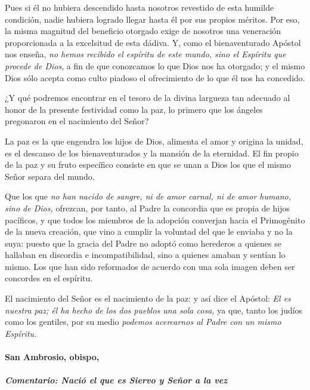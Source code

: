 \documentclass[]{article}
\let\oldparagraph\paragraph
\renewcommand{\paragraph}[1]{\oldparagraph{#1}\mbox{}}
\let\oldsubparagraph\subparagraph
\renewcommand{\subparagraph}[1]{\oldsubparagraph{#1}\mbox{}}
\begin{document}
Pues si él no hubiera descendido hasta nosotros revestido de esta
humilde condición, nadie hubiera logrado llegar hasta él por sus propios
méritos. Por eso, la misma magnitud del beneficio otorgado exige de
nosotros una veneración proporcionada a la excelsitud de esta dádiva. Y,
como el bienaventurado Apóstol nos enseña, \emph{no hemos recibido el
espíritu de este mundo, sino el Espíritu que procede de Dios}, a fin de
que conozcamos lo que Dios nos ha otorgado; y el mismo Dios sólo acepta
como culto piadoso el ofrecimiento de lo que él nos ha concedido.

¿Y qué podremos encontrar en el tesoro de la divina largueza tan
adecuado al honor de la presente festividad como la paz, lo primero que
los ángeles pregonaron en el nacimiento del Señor?

La paz es la que engendra los hijos de Dios, alimenta el amor y origina
la unidad, es el descanso de los bienaventurados y la mansión de la
eternidad. El fin propio de la paz y su fruto específico consiste en que
se unan a Dios los que el mismo Señor separa del mundo.

Que los que \emph{no han nacido de sangre, ni de amor carnal, ni de amor
humano, sino de Dios,} ofrezcan, por tanto, al Padre la concordia que es
propia de hijos pacíficos, y que todos los miembros de la adopción
converjan hacia el Primogénito de la nueva creación, que vino a cumplir
la voluntad del que le enviaba y no la suya: puesto que la gracia del
Padre no adoptó como herederos a quienes se hallaban en discordia e
incompatibilidad, sino a quienes amaban y sentían lo mismo. Los que han
sido reformados de acuerdo con una sola imagen deben ser concordes en el
espíritu.

El nacimiento del Señor es el nacimiento de la paz: y así dice el
Apóstol: \emph{El es nuestra paz; él ha hecho de los dos pueblos una
sola cosa,} ya que, tanto los judíos como los gentiles, por su medio
\emph{podemos acercarnos al Padre con un mismo
Espíritu.}\protect\hypertarget{_Toc448662804}{}{\protect\hypertarget{_Toc448690323}{}{\protect\hypertarget{_Toc448708346}{}{\protect\hypertarget{_Toc448709432}{}{\protect\hypertarget{_Toc449554434}{}{}}}}}

\paragraph{San Ambrosio, obispo,}\label{san-ambrosio-obispo-1}

\subparagraph{Comentario: Nació el que es Siervo y Señor a la
vez}\label{comentario-naciuxf3-el-que-es-siervo-y-seuxf1or-a-la-vez}
\end{document}
